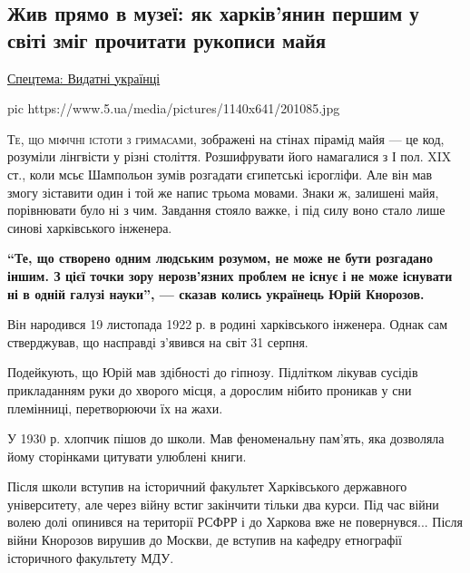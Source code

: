  
 
 

\subsection{Жив прямо в музеї: як харків'янин першим у світі зміг прочитати рукописи майя}
\label{sec:19_11_2020.news.ua.5ua.1.knorozov}
\href{https://www.5.ua/spetstemy/154}{Спецтема: Видатні українці}


\ifcmt
pic https://www.5.ua/media/pictures/1140x641/201085.jpg
\fi

\lettrine[lines=3]{Т}{е, що міфічні істоти з гримасами}, зображені на стінах пірамід майя --- це
код, розуміли лінгвісти у різні століття. Розшифрувати його намагалися з І
пол. XIX ст., коли мсьє Шампольон зумів розгадати єгипетські ієрогліфи.
Але він мав змогу зіставити один і той же напис трьома мовами. Знаки ж,
залишені майя, порівнювати було ні з чим. Завдання стояло важке, і під
силу воно стало лише синові харківського інженера.

\begin{leftbar}
  \bfseries
  \enquote{Те, що створено одним людським розумом, не може не бути розгадано
  іншим. З цієї точки зору нерозв'язних проблем не існує і не може
  існувати ні в одній галузі науки}, --- сказав колись українець Юрій
  Кнорозов.
\end{leftbar}

Він народився 19 листопада 1922 р. в родині харківського інженера. Однак
сам стверджував, що насправді з'явився на світ 31 серпня.

Подейкують, що Юрій мав здібності до гіпнозу. Підлітком лікував сусідів
прикладанням руки до хворого місця, а дорослим нібито проникав у сни
племінниці, перетворюючи їх на жахи.

У 1930 р. хлопчик пішов до школи. Мав феноменальну пам'ять, яка дозволяла
йому сторінками цитувати улюблені книги.

Після школи вступив на історичний факультет Харківського державного
університету, але через війну встиг закінчити тільки два курси. Під час
війни волею долі опинився на території РСФРР і до Харкова вже не
повернувся... Після війни Кнорозов вирушив до Москви, де вступив на
кафедру етнографії історичного факультету МДУ.


